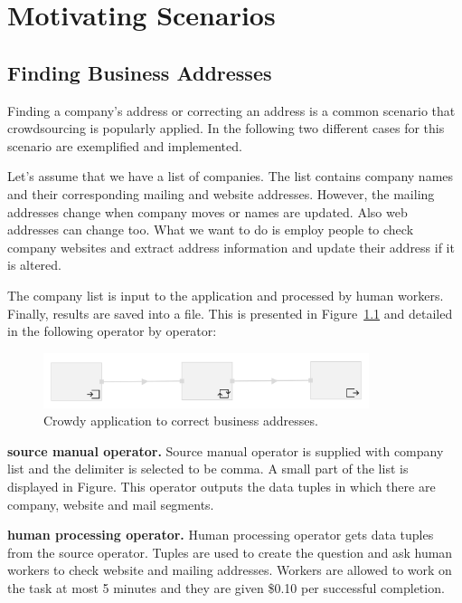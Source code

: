 \chapter{Motivating Scenarios}
\label{chap:examples}

\section{Finding Business Addresses}
Finding a company's address or correcting an address is a common scenario that crowdsourcing is popularly applied. In the following two different cases for this scenario are exemplified and implemented.

Let's assume that we have a list of companies. The list contains company names and their corresponding mailing and website addresses. However, the mailing addresses change when company moves or names are updated. Also web addresses can change too. What we want to do is employ people to check company websites and extract address information and update their address if it is altered.

The company list is input to the application and processed by human workers. Finally, results are saved into a file. This is presented in Figure~\ref{fig:scenario1} and detailed in the following operator by operator:

\begin{figure}[ht]
	\centering
	\includegraphics[width=0.85\textwidth]{figures/scenarios/naive.png}
	\caption{Crowdy application to correct business addresses.}
	\label{fig:scenario1}
\end{figure}

\textbf{source manual operator.}
Source manual operator is supplied with company list and the delimiter is selected to be comma. A small part of the list is displayed in Figure. This operator outputs the data tuples in which there are company, website and mail segments.


\textbf{human processing operator.}
Human processing operator gets data tuples from the source operator. Tuples are used to create the question and ask human workers to check website and mailing addresses. Workers are allowed to work on the task at most 5 minutes and they are given \$0.10 per successful completion.

